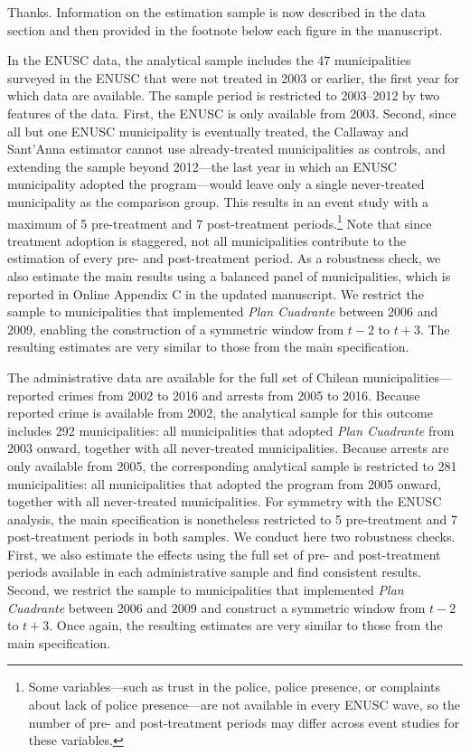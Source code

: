 

Thanks. Information on the estimation sample is now described in the data section and then provided in the footnote below each figure in the manuscript.

In the ENUSC data, the analytical sample includes the 47 municipalities surveyed in the ENUSC that were not treated in 2003 or earlier, the first year for which data are available. The sample period is restricted to 2003--2012 by two features of the data. First, the ENUSC is only available from 2003. Second, since all but one ENUSC municipality is eventually treated, the Callaway and Sant'Anna estimator cannot use already-treated municipalities as controls, and extending the sample beyond 2012---the last year in which an ENUSC municipality adopted the program---would leave only a single never-treated municipality as the comparison group. This results in an event study with a maximum of 5 pre-treatment and 7 post-treatment periods.\footnote{Some variables---such as trust in the police, police presence, or complaints about lack of police presence---are not available in every ENUSC wave, so the number of pre- and post-treatment periods may differ across event studies for these variables.} Note that since treatment adoption is staggered, not all municipalities contribute to the estimation of every pre- and post-treatment period. As a robustness check, we also estimate the main results using a balanced panel of municipalities, which is reported in Online Appendix C in the updated manuscript. We restrict the sample to municipalities that implemented \emph{Plan Cuadrante} between 2006 and 2009, enabling the construction of a symmetric window from $t-2$ to $t+3$. The resulting estimates are very similar to those from the main specification.


The administrative data are available for the full set of Chilean municipalities---reported crimes from 2002 to 2016 and arrests from 2005 to 2016. Because reported crime is available from 2002, the analytical sample for this outcome includes 292 municipalities: all municipalities that adopted \emph{Plan Cuadrante} from 2003 onward, together with all never-treated municipalities. Because arrests are only available from 2005, the corresponding analytical sample is restricted to 281 municipalities: all municipalities that adopted the program from 2005 onward, together with all never-treated municipalities. For symmetry with the ENUSC analysis, the main specification is nonetheless restricted to 5 pre-treatment and 7 post-treatment periods in both samples. We conduct here two robustness checks. First, we also estimate the effects using the full set of pre- and post-treatment periods available in each administrative sample and find consistent results. Second, we restrict the sample to municipalities that implemented \emph{Plan Cuadrante} between 2006 and 2009 and construct a symmetric window from $t-2$ to $t+3$. Once again, the resulting estimates are very similar to those from the main specification.

